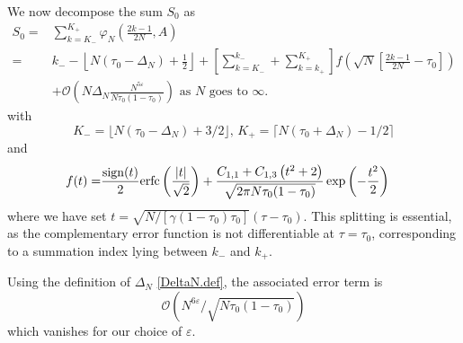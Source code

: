 \documentclass[pdflatex,sn-mathphys-num]{sn-jnl}
\theoremstyle{thmstyleone}
\numberwithin{equation}{section}
\begin{document}
We now decompose the sum $S_{0}$ as
\begin{equation}
\begin{split}
S_0=&\sum_{k=K_-}^{K_+}\varphi_N\left(\frac{2k-1}{2N},A\right)\\
=&k_--\left\lfloor N(\tau_0-\Delta_N)+\frac{1}{2}\right\rfloor+\left[\sum_{k=K_-}^{k_-}+\sum_{k=k_+}^{K_+}\right] f\left(\sqrt{N}\left[\frac{2k-1}{2N}-\tau_0\right]\right)\\
&+\mathcal{O}\left(N\Delta_N\frac{N^{5\varepsilon}}{N\tau_0(1-\tau_0)}\right)\text{ as } N \text{ goes to } \infty.
\end{split}
\end{equation}
with
\begin{equation}
    K_-=\lfloor N(\tau_0-\Delta_N)+3/2\rfloor,\,K_+=\lceil N(\tau_0+\Delta_N)-1/2\rceil
\end{equation}
and
\begin{equation}\label{f.def}
\begin{split}
f(t)=&\frac{{\rm sign}(t)}{2}\mathrm{erfc}\left(\frac{|t|}{\sqrt{2}}\right)+\frac{C_{1,1}+C_{1,3}\left(t^2+2\right)}{\sqrt{2\pi N\tau_0(1-\tau_0)}}\exp\left(-\frac{t^2}{2}\right)
\end{split}
\end{equation}
where we have set $t=\sqrt{N/[\gamma(1-\tau_0)\tau_0]}(\tau-\tau_0)$.
This splitting is essential, as the complementary error function is not differentiable at $\tau=\tau_0$, corresponding to a summation index lying between $k_{-}$ and $k_{+}$.

Using the definition of $\Delta_{N}$ \eqref{DeltaN.def}, the associated error term is 
\begin{equation}
    \mathcal{O}(N^{6\varepsilon}/\sqrt{N\tau_0(1-\tau_0)})
\end{equation}
which vanishes for our choice of $\varepsilon$.
\end{document}
